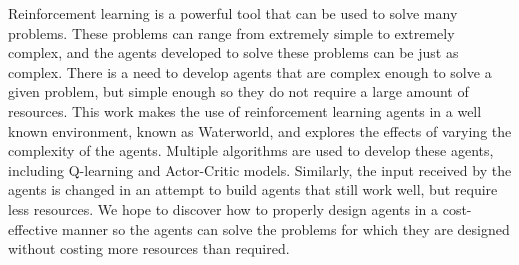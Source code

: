 Reinforcement learning is a powerful tool that can be used to solve many problems.
These problems can range from extremely simple to extremely complex, and the agents
developed to solve these problems can be just as complex.
There is a need to develop agents that are complex enough to solve a given problem,
but simple enough so they do not require a large amount of resources.
This work makes the use of reinforcement learning agents in a well known
environment, known as Waterworld, and explores the effects of varying the complexity
of the agents.
Multiple algorithms are used to develop these agents, including Q-learning and
Actor-Critic models.
Similarly, the input received by the agents is changed in an attempt to build agents
that still work well, but require less resources.
We hope to discover how to properly design agents in a cost-effective manner so the
agents can solve the problems for which they are designed without costing more
resources than required.
